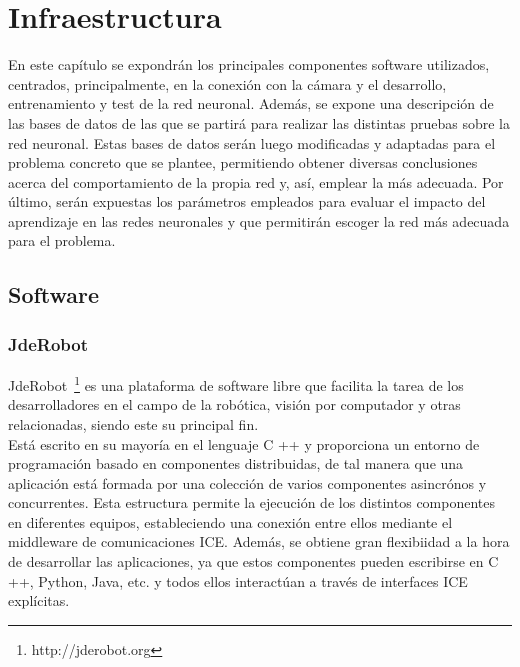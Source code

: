 \chapter{Infraestructura}\label{cap.infraestructura}
En este capítulo se expondrán los principales componentes software utilizados, centrados, principalmente, en la conexión con la cámara y el desarrollo, entrenamiento y test de la red neuronal. Además, se expone una descripción de las bases de datos de las que se partirá para realizar las distintas pruebas sobre la red neuronal. Estas bases de datos serán luego modificadas y adaptadas para el problema concreto que se plantee, permitiendo obtener diversas conclusiones acerca del comportamiento de la propia red y, así, emplear la más adecuada. Por último, serán expuestas los parámetros empleados para evaluar el impacto del aprendizaje en las redes neuronales y que permitirán escoger la red más adecuada para el problema.\\

\section{Software}

\subsection{JdeRobot}\label{sec.jderobot}
JdeRobot~\footnote{http://jderobot.org} es una plataforma de software libre que facilita la tarea de los desarrolladores en el campo de la robótica, visión por computador y otras relacionadas, siendo este su principal fin.\\ 

Está escrito en su mayoría en el lenguaje C ++ y proporciona un entorno de programación basado en componentes distribuidas, de tal manera que una aplicación está formada por una colección de varios componentes asincrónos y concurrentes. Esta estructura permite la ejecución de los distintos componentes en diferentes equipos, estableciendo una conexión entre ellos mediante el middleware de comunicaciones ICE. Además, se obtiene gran flexibiidad a la hora de desarrollar las aplicaciones, ya que estos componentes pueden escribirse en C ++, Python, Java, etc. y todos ellos interactúan a través de interfaces ICE explícitas.\\ 

